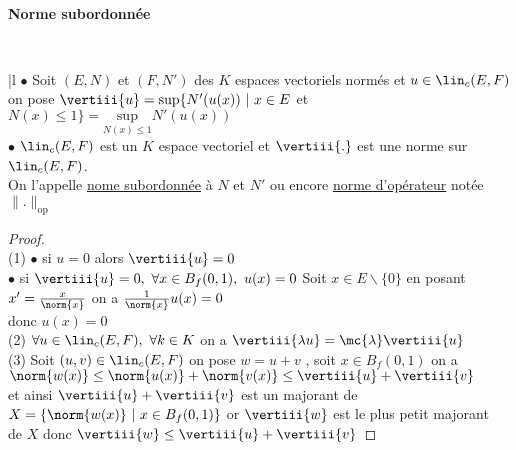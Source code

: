 		\paragraph{Norme subordonnée} ${}$ \\
		\hspace*{1.5cm} \begin{minipage}{12.71cm} ${}$ \vspace*{0.15cm}\\ \hspace*{0.21cm} \begin{blockarray}{|l} 
		$\bullet$ Soit $(E,N)$ et $(F,N' )$ des 
		$K$ espaces vectoriels normés et $u\in \lin_c (E,F)$ \\ on pose $\vertiii{u} = \mathrm{sup} \{N' (u(x)) ~|~x\in E$ et $N(x) \leq 1 \} = 
		\underset{N(x)\leq 1}{\mathrm{sup}} N' (u(x))$\\
		$\bullet$ $\lin_c (E,F)$ est un $K$ espace vectoriel et $\vertiii{.}$ est une norme sur $\lin_c (E,F)$. \\ On l'appelle 
		\underline{nome subordonnée} à $N$ et $N'$ ou encore \underline{norme d'opérateur} notée $\| . \|_{\mathrm{op}}$ \end{blockarray} \end{minipage} 
		\vspace*{-0.1cm} \trait 
		\vspace*{-1.4cm} \begin{proof} ${}$\\
		{\tiny (1)} $\bullet$ si $u=0$ alors $\vertiii{u} = 0$ \\ \hspace*{0.33cm} $\bullet$ si $\vertiii{u} = 0 ,~\forall x\in B_f(0,1) ,
		~u(x) = 0$ Soit $x\in E\backslash \{0\}$ en posant $x' = \frac{x}{\norm{x}}$  on a $\frac{1}{\norm{x}}u(x) = 0$ 
		\\ \hspace*{0.33cm} donc $u(x)=0$ \\
		{\tiny (2)} $\forall u\in \lin_c (E,F) ,~\forall k\in K$ on a $\vertiii{\lambda u} = \mc{\lambda }\vertiii{u}$ \\
		{\tiny (3)} Soit $(u,v) \in \lin_c (E,F)$ on pose $w=u+v$ , soit $x\in B_f(0,1)$ on a  $\norm{w(x)} \leq 
		\norm{u(x)} + \norm{v(x)} \leq \vertiii{u} + \vertiii{v}$ \\ \hspace*{0.33cm} et ainsi $\vertiii{u} + \vertiii{v}$ est un majorant de  
		$X=\{\norm{w(x)} ~|~x\in B_f(0,1) \}$ or $\vertiii{w}$ est le plus petit majorant \\ \hspace*{0.33cm} de $X$ donc $\vertiii{w} 
		\leq \vertiii{u}+\vertiii{v}$
		\end{proof}
